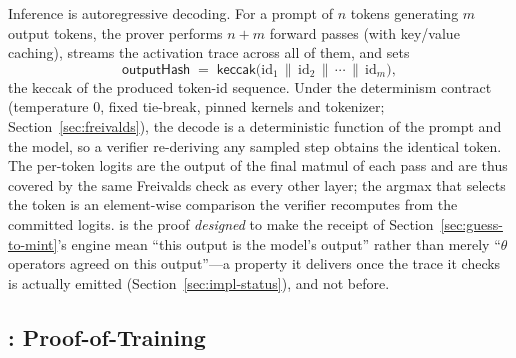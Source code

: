 Inference is autoregressive decoding. For a prompt of $n$ tokens generating $m$
output tokens, the prover performs $n+m$ forward passes (with key/value caching),
streams the activation trace across all of them, and sets
\begin{equation}
\mathsf{outputHash} \;=\; \mathsf{keccak}\bigl(\text{id}_1 \,\|\, \text{id}_2 \,\|\, \cdots \,\|\, \text{id}_m\bigr),
\end{equation}
the keccak of the produced token-id sequence. Under the determinism contract
(temperature $0$, fixed tie-break, pinned kernels and tokenizer;
Section~\ref{sec:freivalds}), the decode is a deterministic function of the prompt
and the model, so a verifier re-deriving any sampled step obtains the identical
token. The per-token logits are the output of the final matmul of each pass and are
thus covered by the same Freivalds check as every other layer; the argmax that
selects the token is an element-wise comparison the verifier recomputes from the
committed logits. \PoI{} is the proof \emph{designed} to make the receipt of
Section~\ref{sec:guess-to-mint}'s engine mean ``this output is the model's output''
rather than merely ``$\theta$ operators agreed on this output''---a property it
delivers once the trace it checks is actually emitted (Section~\ref{sec:impl-status}),
and not before.

\subsection{\PoT{}: Proof-of-Training}

